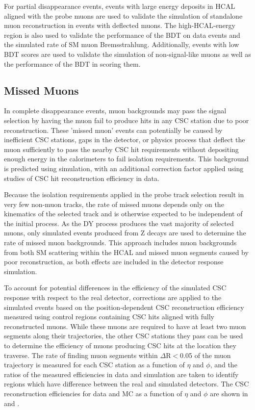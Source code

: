 For partial disappearance events, events with large energy deposits in HCAL aligned with the probe muons are used to validate the simulation of standalone muon reconstruction in events with deflected muons.
The high-HCAL-energy region is also used to validate the performance of the BDT on data events and the simulated rate of SM muon Bremsstrahlung.
Additionally, events with low BDT scores are used to validate the simulation of non-signal-like muons as well as the performance of the BDT in scoring them.

\subsection{Missed Muons}
\label{sec:missedMuons}
In complete disappearance events, muon backgrounds may pass the signal selection by having the muon fail to produce hits in any CSC station due to poor reconstruction. 
These 'missed muon' events can potentially be caused by inefficient CSC stations, gaps in the detector, or physics process that deflect the muon sufficiently to pass the nearby CSC hit requirements without depositing enough energy in the calorimeters to fail isolation requirements. 
This background is predicted using simulation, with an additional correction factor applied using studies of CSC hit reconstruction efficiency in data. 

Because the isolation requirements applied in the probe track selection result in very few non-muon tracks, the rate of missed muons depends only on the kinematics of the selected track and is otherwise expected to be independent of the initial process. 
As the DY process produces the vast majority of selected muons, only simulated events produced from Z decays are used to determine the rate of missed muon backgrounds.
This approach includes muon backgrounds from both SM scattering within the HCAL and missed muon segments caused by poor reconstruction, as both effects are included in the detector response simulation.

To account for potential differences in the efficiency of the simulated CSC response with respect to the real detector, corrections are applied to the simulated events based on the position-dependent CSC reconstruction efficiency measured using control regions containing CSC hits aligned with fully reconstructed muons.
While these muons are required to have at least two muon segments along their trajectories, the other CSC stations they pass can be used to determine the efficiency of muons producing CSC hits at the location they traverse.
The rate of finding muon segments within $\Delta$R$<$0.05 of the muon trajectory is measured for each CSC station as a function of $\eta$ and $\phi$, and the ratios of the measured efficiencies in data and simulation are taken to identify regions which have difference between the real and simulated detectors.
The CSC reconstruction efficiencies for data and MC as a function of $\eta$ and $\phi$ are shown in  and .

